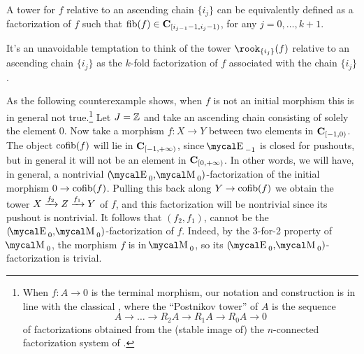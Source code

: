 \begin{remark}
A tower for $f$ relative to an ascending chain $\{i_j\}$ can be equivalently defined as a factorization of $f$ such that $\mathrm{fib}(f)\in \textbf{C}_{[i_{j-1}-1,i_j-1)}$, for any $j=0,\dots,k+1$.
\end{remark}
\begin{remark}
\marginnote{\textdbend} 
It's an unavoidable temptation to think of the tower $\rook_{\{i_j\}}(f)$ relative to an ascending chain $\{i_j\}$ as the $k$\hyp{}fold factorization of $f$ associated with the chain $\{i_j\}$. 

As the following counterexample shows, when $f$ is not an initial morphism this is in general not true.\footnote{When $f\colon A\to 0$ is the terminal morphism, our notation and construction is in line with the classical \cite{LurieHA}, where the ``Postnikov tower'' of $A$ is the sequence
\[
A\to \dots \to R_2A\to R_1A\to R_0A \to 0
\]
of factorizations obtained from the (stable image of) the $n$\hyp{}connected factorization system of \cite{Joy}.} Let $J=\mathbb{Z} $ and take an ascending chain consisting of solely the element $0$. Now take a morphism $f\colon X\to Y$ between two elements in $\textbf{C}_{[-1,0)}$. The object $\text{cofib}(f)$ will lie in $\textbf{C}_{[-1,+\infty)}$, since $\EE_{-1}$ is closed for pushouts, but in general it will not be an element in $\textbf{C}_{[0,+\infty)}$. In other words, we will have, in general, a nontrivial $(\EE_0,\MM_0)$\hyp{}factorization of the initial morphism $0\to \text{cofib}(f)$. Pulling this back along $Y\to \text{cofib}(f)$ we obtain the tower $X\xrightarrow{f_2} Z\xrightarrow{f_1} Y$ of $f$, and this factorization will be nontrivial since its pushout is nontrivial. It follows that $(f_2,f_1)$, cannot be the $(\EE_0,\MM_0)$\hyp{}factorization of $f$. Indeed, by the 3\hyp{}for-2 property of $\MM_0$, the morphism $f$ is in $\MM_0$, so its $(\EE_0,\MM_0)$\hyp{}factorization is trivial. 
\end{remark}
